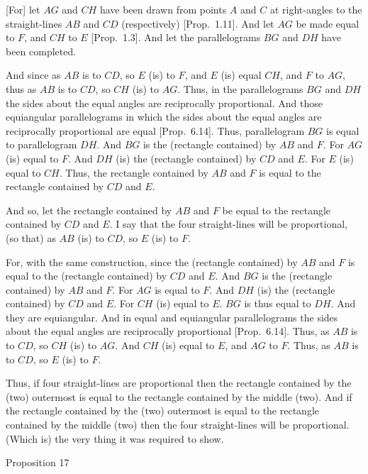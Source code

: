 \mbox{[}For] let $AG$ and $CH$ have been drawn from points $A$ and $C$
at right-angles to the straight-lines $AB$ and $CD$ (respectively)  [Prop.~1.11]. 
And let $AG$ be made equal to $F$, and $CH$ to $E$  [Prop.~1.3]. And
let the parallelograms $BG$ and $DH$ have been completed.

And since as $AB$ is to $CD$, so $E$ (is) to $F$, and $E$ (is) equal $CH$,
and $F$ to $AG$, thus as $AB$ is to $CD$, so $CH$ (is) to $AG$. Thus, in the parallelograms $BG$ and $DH$ the sides about the equal angles are
reciprocally proportional. And those equiangular parallelograms
in which the sides about the equal angles are reciprocally proportional
are equal [Prop.~6.14]. Thus, parallelogram
$BG$ is equal to parallelogram $DH$. And $BG$ is the (rectangle contained)
by $AB$ and $F$. For $AG$ (is) equal to $F$. And $DH$ (is) the (rectangle
contained) by $CD$ and $E$. For $E$ (is) equal to $CH$. Thus, the rectangle
contained by $AB$ and $F$ is equal to the rectangle contained by $CD$ and $E$.

And so, let the rectangle contained by $AB$ and $F$  be equal to the rectangle
contained by $CD$ and $E$. I say that the four straight-lines will be proportional,
(so that) as $AB$ (is) to $CD$, so $E$ (is) to $F$.

For,  with the same construction, since the (rectangle contained) by $AB$ and $F$
is equal to the (rectangle contained) by $CD$ and $E$. And $BG$ is the (rectangle
contained) by $AB$ and $F$. For $AG$ is equal to $F$. And $DH$ (is) the
(rectangle contained) by $CD$ and $E$. For $CH$ (is) equal to $E$. $BG$ is thus
equal to $DH$. And they are equiangular.  And in equal and equiangular parallelograms  the sides about the equal angles are reciprocally
proportional [Prop.~6.14]. Thus, as $AB$
is to $CD$, so $CH$ (is) to $AG$. And $CH$ (is) equal to $E$, and $AG$ to $F$.
Thus, as $AB$  is to $CD$, so $E$ (is) to $F$.

Thus, if four straight-lines are proportional then the
rectangle contained by the (two) outermost is equal to the rectangle contained
by the middle (two). And if the rectangle contained by the (two) outermost
is
equal to the rectangle contained by the middle (two) then the four straight-lines
will be proportional. (Which is) the very thing it was required to show.


\begin{center}
{\large Proposition 17}
\end{center}

